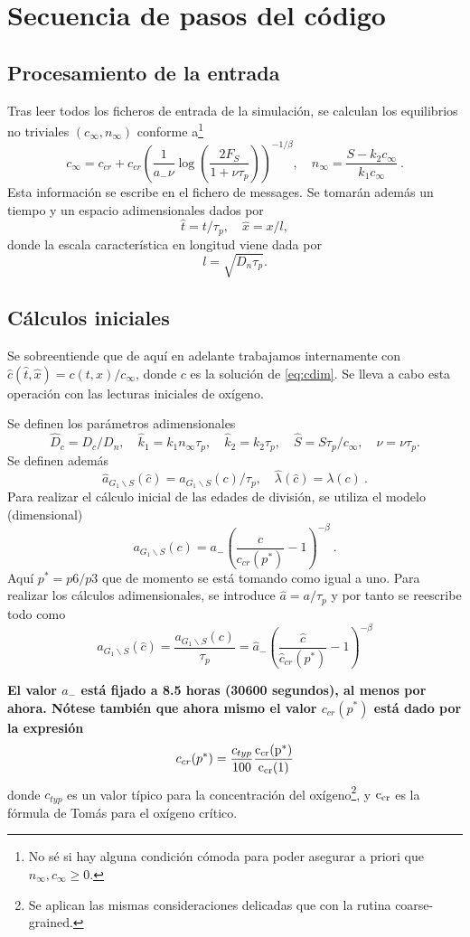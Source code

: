 \documentclass[12pt]{article}
\numberwithin{equation}{section}
\begin{document}
\section{Secuencia de pasos del c\'odigo}

\subsection{Procesamiento de la entrada}
Tras leer todos los ficheros de entrada de la simulaci\'on, se calculan los equilibrios no triviales $(c_\infty,n_\infty)$ conforme a\footnote{No s\'e si hay alguna condici\'on c\'omoda para poder asegurar a priori que $n_\infty, c_\infty \ge 0$.} 
\[
c_\infty=c_{cr} + c_{cr} \left( \frac{1}{a_- \nu}\log \left(\frac{2 F_S}{1+\nu \tau_p}\right)\right)^{-1/\beta},\quad n_\infty= \frac{S-k_2 c_\infty}{k_1 c_\infty}\:.
\]
Esta informaci\'on se escribe en el fichero de messages. Se tomar\'an adem\'as un tiempo y un espacio adimensionales dados por
\[
\hat t=t/\tau_p,\quad \hat x = x/l,
\]
donde la escala caracter\'istica en longitud viene dada por
\[
l=\sqrt{D_n \tau_p}.
\]
\subsection{C\'alculos iniciales}
Se sobreentiende que de aqu\'i en adelante trabajamos internamente con $\hat c(\hat t,\hat x)=c(t,x)/c_\infty$, donde $c$ es la soluci\'on de \eqref{eq:cdim}. Se lleva a cabo esta operaci\'on con las lecturas iniciales de  ox\'igeno.

Se definen los par\'ametros adimensionales
\[
\hat D_c=D_c/D_n,\quad \hat k_1=k_1 n_\infty \tau_p,\quad \hat k_2 = k_2 \tau_p,\quad \hat S= S \tau_p/c_\infty,\quad \hat \nu=\nu \tau_p.
\]
Se definen adem\'as 
\[
\hat{a}_{G_1\backslash S}(\hat c)= a_{G_1\backslash S}(c)/\tau_p,\quad \hat \lambda(\hat c) = \lambda(c)\:.
\]
Para realizar el c\'alculo inicial de las edades de divisi\'on, se utiliza el modelo (dimensional)
\[
a_{G_1\backslash S}(c)=a_-\left(\frac{c}{c_{cr}(p^*)}-1\right)^{-\beta}\:.
\]
Aqu\'i $p^*=p6/p3$ que de momento se est\'a tomando como igual a uno. Para realizar los c\'alculos adimensionales, se introduce $\hat a = a/\tau_p$ y por tanto se reescribe todo como
\[
\hat{a}_{G_1\backslash S}(\hat c)= \frac{a_{G_1\backslash S}(c)}{\tau_p}= \hat{a}_- \left(\frac{\hat c}{\hat c_{cr}(p^*)}-1\right)^{-\beta}
\]

{\bf El valor $a_-$ est\'a fijado a 8.5 horas (30600 segundos), al menos por ahora. N\'otese tambi\'en que ahora mismo el valor $c_{cr}(p^*)$ est\'a dado por la expresi\'on}
\[
c_{cr}(p^*) = \frac{c_{typ}}{100} \frac{{\rm c_{cr}(p^*)}}{{\rm c_{cr}(1)}}
\]
donde $c_{typ}$ es un valor t\'ipico para la concentraci\'on del ox\'igeno\footnote{Se aplican las mismas consideraciones delicadas que con la rutina coarse-grained.}, y ${\rm c_{cr}}$ es la f\'ormula de Tom\'as para el ox\'igeno cr\'itico.
\end{document}
